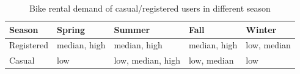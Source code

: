 \documentclass[12pt]{article}
\begin{document}
	\begin{table}[H]
		\centering
		\begin{tabular}{|l|l|l|l|l|}
			\hline
			Season & 	Spring & Summer & Fall & Winter\\ \hline
			Registered & median, high & median, high & median, high & low, median\\
			Casual & low & low, median, high & low, median & low \\ \hline
		\end{tabular}
		\caption{Bike rental demand of casual/registered users in different season}
	\end{table}
		
\end{document}
